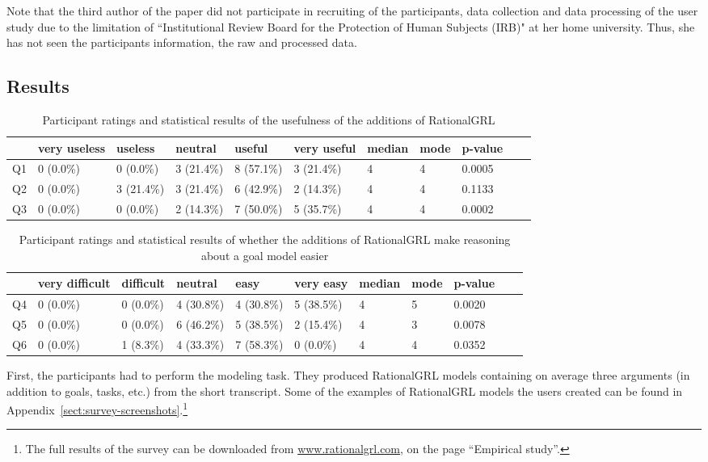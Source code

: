 Note that the third author of the paper did not participate in recruiting of the participants, data collection and data processing of the user study due to the limitation of ``Institutional Review Board for the Protection of Human Subjects (IRB)" at her home university. Thus, she has not seen the participants information, the raw and processed data.

\subsection{Results}\label{sec:survey:results}

\begin{table*}[t]
\centering
\begin{tabularx}{0.95\textwidth}{l|l|l|l|l|l||l|l|l|l|l}
& very useless & useless & neutral & useful & very useful & median & mode & p-value \\
\hline
Q1 & 0 (0.0\%) & 0 (0.0\%)  & 3 (21.4\%) & 8 (57.1\%) & 3 (21.4\%) & 4 & 4 & 0.0005 \\
Q2 & 0 (0.0\%) & 3 (21.4\%) & 3 (21.4\%) & 6 (42.9\%) & 2 (14.3\%) & 4 & 4 & 0.1133 \\
Q3 & 0 (0.0\%) & 0 (0.0\%)  & 2 (14.3\%) & 7 (50.0\%) & 5 (35.7\%) & 4 & 4 & 0.0002 
\end{tabularx}
\caption{Participant ratings and statistical results of the usefulness of the additions of RationalGRL}
\label{table:survey:table2}
\end{table*}

\begin{table*}[t]
\centering
\begin{tabularx}{0.95\textwidth}{l|l|l|l|l|l||l|l|l|l|l}
& very difficult & difficult & neutral & easy & very easy & median & mode & p-value \\
\hline
Q4  & 0 (0.0\%) & 0 (0.0\%) & 4 (30.8\%) & 4 (30.8\%) & 5 (38.5\%) & 4 & 5 & 0.0020 \\
Q5  & 0 (0.0\%) & 0 (0.0\%) & 6 (46.2\%) & 5 (38.5\%) & 2 (15.4\%) & 4 & 3 & 0.0078\\
Q6 & 0 (0.0\%) & 1 (8.3\%) & 4 (33.3\%) & 7 (58.3\%) & 0 (0.0\%)  & 4 & 4 & 0.0352
\end{tabularx}
\caption{Participant ratings and statistical results of whether the additions of RationalGRL make reasoning about a goal model easier}
\label{table:survey:table3}
\end{table*}

First, the participants had to perform the modeling task. They produced RationalGRL models containing on average three arguments (in addition  to goals, tasks, etc.) from the short transcript. Some of the examples of RationalGRL models the users created can be found in Appendix~\ref{sect:survey-screenshots}.\footnote{The full results of the survey can be downloaded from \url{www.rationalgrl.com}, on the page ``Empirical study''.}

